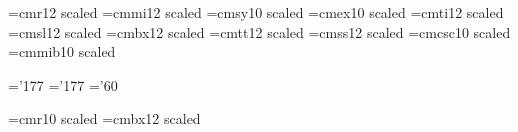 \font\fourteenrm=cmr12	scaled		%
\font\fourteeni=cmmi12	scaled		%
\font\fourteensy=cmsy10	scaled		%
\font\fourteenex=cmex10	scaled		%
\font\fourteenit=cmti12	scaled		%
\font\fourteensl=cmsl12	scaled		%
\font\fourteenbf=cmbx12	scaled		%
\font\fourteentt=cmtt12	scaled		%
\font\fourteenss=cmss12	scaled		%
\font\fourteensc=cmcsc10 scaled	%
\font\fourteenbi=cmmib10 scaled	%

\skewchar\fourteeni='177
\skewchar\fourteenbi='177
\skewchar\fourteensy='60

\def\fourteenpoint{\ifmmode\err@badsizechange\else
	\textfont0=\fourteenrm \scriptfont0=\tenrm \scriptscriptfont0=\sevenrm
	\textfont1=\fourteeni  \scriptfont1=\teni  \scriptscriptfont1=\seveni
	\textfont2=\fourteensy \scriptfont2=\tensy \scriptscriptfont2=\sevensy
	\textfont3=\fourteenex \scriptfont3=\tenex \scriptscriptfont3=\tenex
	\textfont4=\fourteenit \scriptfont4=\tenit \scriptscriptfont4=\sevenit
	\textfont5=\fourteensl
	\textfont6=\fourteenbf \scriptfont6=\tenbf \scriptscriptfont6=\sevenbf
	\textfont7=\fourteentt
	\textfont8=\fourteenbi \scriptfont8=\tenbi \scriptscriptfont8=\seveni
	\def\rm{\fourteenrm\fam=0 }%
	\def\it{\fourteenit\fam=4 }%
	\def\sl{\fourteensl\fam=5 }%
	\def\bf{\fourteenbf\fam=6 }%
	\def\tt{\fourteentt\fam=7}%
	\def\ss{\fourteenss}%
	\def\sc{\fourteensc}%
	\def\bmit{\fam=8 }%
	\rm\setparameters\setbaselines\fi}


\font\seventeenrm=cmr10 scaled		%
\font\twentybf=cmbx12	scaled		%



\newdimen\rp@
\newcount\@basestretchnum
\newskip\@baseskip
\newskip\headskip
\newskip\footskip


\def\setparameters{\rp@=.1em
	\headskip=24\rp@
	\footskip=\headskip
	\delimitershortfall=5\rp@
	\nulldelimiterspace=1.2\rp@
	\scriptspace=0.5\rp@
	\abovedisplayskip=10\rp@ plus3\rp@ minus5\rp@
	\belowdisplayskip=10\rp@ plus3\rp@ minus5\rp@
	\abovedisplayshortskip=5\rp@ plus2\rp@ minus4\rp@
	\belowdisplayshortskip=10\rp@ plus3\rp@ minus5\rp@
	\normallineskip=\rp@
	\lineskip=\normallineskip
	\normallineskiplimit=0pt
	\lineskiplimit=\normallineskiplimit
	\jot=3\rp@
	\setbox0=\hbox{\the\textfont3 B}\p@renwd=\wd0
	\skip\footins=12\rp@ plus3\rp@ minus3\rp@
	\skip\topins=0pt plus0pt minus0pt}

